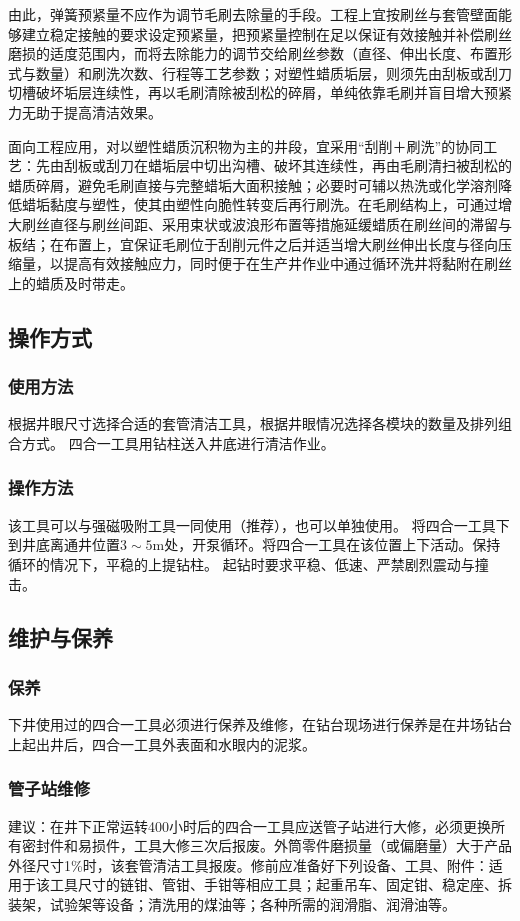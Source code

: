 由此，弹簧预紧量不应作为调节毛刷去除量的手段。工程上宜按刷丝与套管壁面能够建立稳定接触的要求设定预紧量，把预紧量控制在足以保证有效接触并补偿刷丝磨损的适度范围内，而将去除能力的调节交给刷丝参数（直径、伸出长度、布置形式与数量）和刷洗次数、行程等工艺参数；对塑性蜡质垢层，则须先由刮板或刮刀切槽破坏垢层连续性，再以毛刷清除被刮松的碎屑，单纯依靠毛刷并盲目增大预紧力无助于提高清洁效果。

面向工程应用，对以塑性蜡质沉积物为主的井段，宜采用“刮削＋刷洗”的协同工艺：先由刮板或刮刀在蜡垢层中切出沟槽、破坏其连续性，再由毛刷清扫被刮松的蜡质碎屑，避免毛刷直接与完整蜡垢大面积接触；必要时可辅以热洗或化学溶剂降低蜡垢黏度与塑性，使其由塑性向脆性转变后再行刷洗。在毛刷结构上，可通过增大刷丝直径与刷丝间距、采用束状或波浪形布置等措施延缓蜡质在刷丝间的滞留与板结；在布置上，宜保证毛刷位于刮削元件之后并适当增大刷丝伸出长度与径向压缩量，以提高有效接触应力，同时便于在生产井作业中通过循环洗井将黏附在刷丝上的蜡质及时带走。


\subsection{操作方式}
\subsubsection{使用方法}
根据井眼尺寸选择合适的套管清洁工具，根据井眼情况选择各模块的数量及排列组合方式。
四合一工具用钻柱送入井底进行清洁作业。
\subsubsection{操作方法}
该工具可以与强磁吸附工具一同使用（推荐），也可以单独使用。
将四合一工具下到井底离通井位置$3\sim 5\mathrm{m}$处，开泵循环。将四合一工具在该位置上下活动。保持循环的情况下，平稳的上提钻柱。
起钻时要求平稳、低速、严禁剧烈震动与撞击。

\subsection{维护与保养}
\subsubsection{保养}
下井使用过的四合一工具必须进行保养及维修，在钻台现场进行保养是在井场钻台上起出井后，四合一工具外表面和水眼内的泥浆。

\subsubsection{管子站维修}
建议：在井下正常运转400小时后的四合一工具应送管子站进行大修，必须更换所有密封件和易损件，工具大修三次后报废。外筒零件磨损量（或偏磨量）大于产品外径尺寸1\%时，该套管清洁工具报废。修前应准备好下列设备、工具、附件：适用于该工具尺寸的链钳、管钳、手钳等相应工具；起重吊车、固定钳、稳定座、拆装架，试验架等设备；清洗用的煤油等；各种所需的润滑脂、润滑油等。

